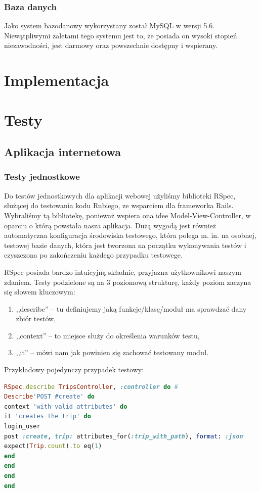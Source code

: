 \documentclass[eng,oneside]{mgr}
\begin{document}
\subsection{Baza danych}
Jako system bazodanowy wykorzystany został MySQL w wersji 5.6. Niewątpliwymi zaletami tego systemu jest to, że posiada on wysoki stopień niezawodności, jest darmowy oraz powszechnie dostępny i wspierany.

\chapter{Implementacja}
\chapter{Testy}
\section{Aplikacja internetowa}
\subsection{Testy jednostkowe}
Do testów jednostkowych dla aplikacji webowej użyliśmy biblioteki RSpec, służącej do testowania kodu Rubiego, ze wsparciem dla frameworka Rails. Wybraliśmy tą bibliotekę, ponieważ wspiera ona idee Model-View-Controller, w oparciu o którą powstała nasza aplikacja. Dużą wygodą jest również automatyczna konfiguracja środowiska testowego, która polega m. in.  na osobnej, testowej bazie danych, która jest tworzona na początku wykonywania testów i czyszczona po zakończeniu każdego przypadku testowege.

RSpec posiada bardzo intuicyjną składnie, przyjazna użytkownikowi naszym zdaniem. Testy podzielone są na 3 poziomową strukturę, każdy poziom zaczyna się słowem kluczowym:
\begin{enumerate}
	\item ,,describe'' – tu definiujemy jaką funkcje/klasę/moduł ma sprawdzać dany zbiór testów,
	\item ,,context'' – to miejsce służy do określenia warunków testu,
	\item ,,it'' – mówi nam jak powinien się zachować testowany moduł.
\end{enumerate}

Przykładowy pojedynczy przypadek testowy:

\begin{lstlisting}[language=Ruby, caption={RSpec test jednostkowy.}]
RSpec.describe TripsController, :controller do #
Describe'POST #create' do
context 'with valid attributes' do
it 'creates the trip' do
login_user
post :create, trip: attributes_for(:trip_with_path), format: :json
expect(Trip.count).to eq(1)
end
end
end
end
\end{lstlisting}
\end{document}
